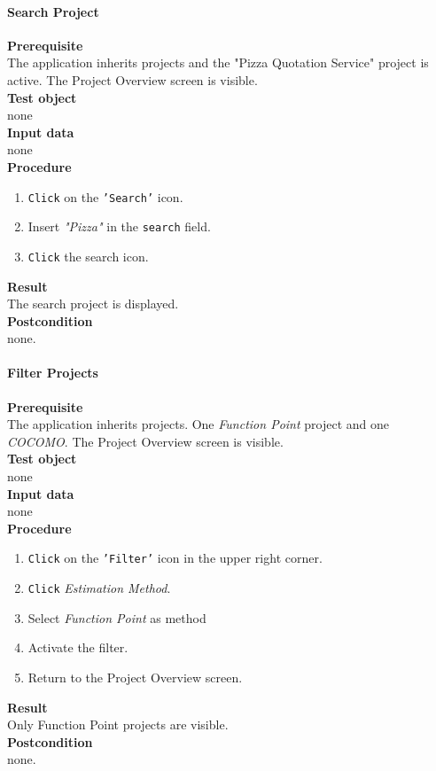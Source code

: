 \paragraph*{\textbf{Search Project}}
\textbf{Prerequisite}\\
The application inherits projects and the "Pizza Quotation Service" project is active. The Project Overview screen is visible.\\
\textbf{Test object}\\
none\\
\textbf{Input data}\\
none\\
\textbf{Procedure}
\begin{enumerate}
	\item \texttt{Click} on the \texttt{'Search'} icon.
	\item Insert \textit{"Pizza"} in the \texttt{search} field.
	\item \texttt{Click} the search icon.
\end{enumerate}
\textbf{Result}\\
The search project is displayed.\\
\textbf{Postcondition}\\
none.
\paragraph*{\textbf{Filter Projects}}
\textbf{Prerequisite}\\
The application inherits projects. One \textit{Function Point} project and one \textit{COCOMO}. The Project Overview screen is visible.\\
\textbf{Test object}\\
none\\
\textbf{Input data}\\
none\\
\textbf{Procedure}
\begin{enumerate}
	\item \texttt{Click} on the \texttt{'Filter'} icon in the upper right corner.
	\item \texttt{Click} \textit{Estimation Method}.
	\item Select \textit{Function Point} as method
	\item Activate the filter.
	\item Return to the Project Overview screen.
\end{enumerate}
\textbf{Result}\\
Only Function Point projects are visible.\\
\textbf{Postcondition}\\
none.
